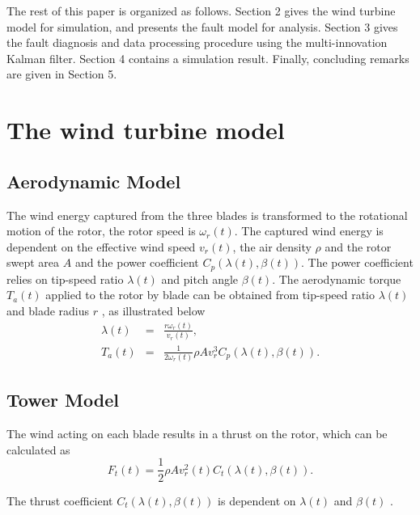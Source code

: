 The rest of this paper is organized as follows. Section 2 gives the wind
turbine model for simulation, and presents the fault model for
analysis. Section 3 gives the fault diagnosis and data processing
procedure using the multi-innovation Kalman filter. Section 4
contains a simulation result. Finally, concluding remarks are given in Section 5.




\section{The wind turbine model}


\subsection{Aerodynamic Model}

The wind energy captured from the three blades is transformed
to the rotational motion of the rotor, the rotor speed is $\omega_r(t)$.
The captured wind energy is dependent on the effective wind speed
$v_r(t)$, the air density $\rho$ and the rotor swept area $A$ and
the power coefficient $C_p(\lambda(t),\beta(t))$. The power
coefficient relies on tip-speed ratio $\lambda(t)$ and pitch
angle $\beta(t)$. The aerodynamic torque $T_a(t)$ applied to
the rotor by blade can be obtained from tip-speed ratio $\lambda(t)$
and blade radius $r$ \cite{ref:13}, as illustrated below
\begin{eqnarray}
  \lambda(t) &=& \frac{r\omega_r(t)}{v_r(t)}, \\
  T_a(t) &=& \frac{1}{2\omega_r(t)} \rho A v_r^3 C_p(\lambda(t),\beta(t)).
\end{eqnarray}



\subsection{Tower Model}

The wind acting on each blade results in a
thrust on the rotor, which can be calculated as \cite{ref:14}
\begin{equation} \label{eq.aero}
  F_t(t) = \frac{1}{2} \rho A v_r^2(t)C_t(\lambda(t),\beta(t)).
\end{equation}

The thrust coefficient  $C_t(\lambda(t),\beta(t))$ is
dependent on  $\lambda(t)$ and $\beta(t)$ .

